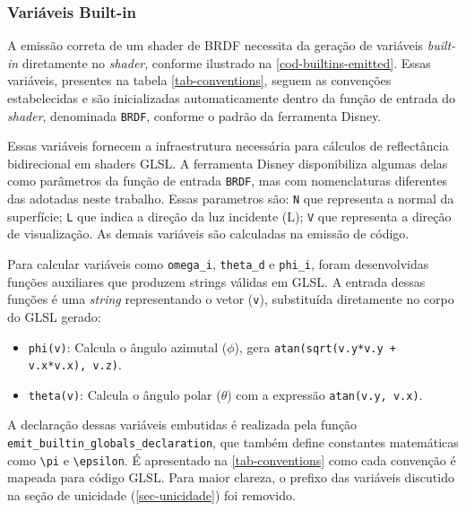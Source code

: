 \subsubsection{Variáveis Built-in}
A emissão correta de um shader de BRDF necessita da geração de variáveis \textit{built-in} diretamente no \textit{shader}, conforme ilustrado na \autoref{cod-builtins-emitted}. Essas variáveis, presentes na tabela \autoref{tab-conventions}, seguem as convenções estabelecidas e são inicializadas automaticamente dentro da função de entrada do \textit{shader}, denominada \verb|BRDF|, conforme o padrão da ferramenta Disney.

Essas variáveis fornecem a infraestrutura necessária para cálculos de reflectância bidirecional em shaders GLSL. A ferramenta Disney disponibiliza algumas delas como parâmetros da função de entrada \verb`BRDF`, mas com nomenclaturas diferentes das adotadas neste trabalho. Essas parametros são: \verb"N" que representa a normal da superfície; \verb"L" que indica a direção da luz incidente (L); \verb"V" que representa a direção de visualização. As demais variáveis são calculadas na emissão de código.

Para calcular variáveis como \verb`omega_i`, \verb`theta_d` e \verb`phi_i`, foram desenvolvidas funções auxiliares que produzem strings válidas em GLSL. A entrada dessas funções é uma \textit{string} representando o vetor (\verb`v`), substituída diretamente no corpo do GLSL gerado:
\begin{itemize}
    \item \verb`phi(v)`: Calcula o ângulo azimutal ($\phi$), gera \verb`atan(sqrt(v.y*v.y + v.x*v.x), v.z)`.
    \item \verb`theta(v)`: Calcula o ângulo polar ($\theta$) com a expressão \verb`atan(v.y, v.x)`.
\end{itemize}

A declaração dessas variáveis embutidas é realizada pela função \\ \verb`emit_builtin_globals_declaration`, que também define constantes matemáticas como \verb`\pi`  e \verb`\epsilon`. É apresentado na \autoref{tab-conventions} como cada convenção é mapeada para código GLSL. Para maior clareza, o prefixo das variáveis discutido na seção de unicidade (\autoref{sec-unicidade}) foi removido.

